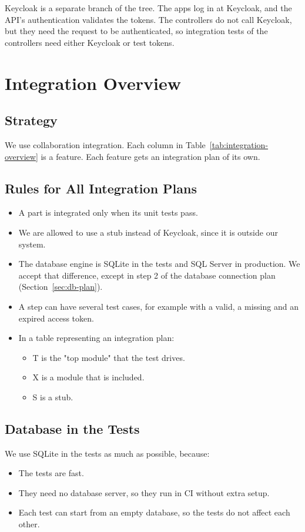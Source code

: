 \documentclass[a4paper,11pt]{article}
\begin{document}
Keycloak is a separate branch of the tree. The apps log in at Keycloak, and the API's authentication validates the tokens. The controllers do not call Keycloak, but they need the request to be authenticated, so integration tests of the controllers need either Keycloak or test tokens.

\section{Integration Overview}

\subsection{Strategy}
We use collaboration integration. Each column in Table~\ref{tab:integration-overview} is a feature. Each feature gets an integration plan of its own.

\subsection{Rules for All Integration Plans}
\begin{itemize}
  \item A part is integrated only when its unit tests pass.
  \item We are allowed to use a stub instead of Keycloak, since it is outside our system.
  \item The database engine is SQLite in the tests and SQL Server in production. We accept that difference, except in step 2 of the database connection plan (Section~\ref{sec:db-plan}).
  \item A step can have several test cases, for example with a valid, a missing and an expired access token.
  \item In a table representing an integration plan:
    \begin{itemize}
      \item T is the "top module" that the test drives.
      \item X is a module that is included.
      \item S is a stub.
    \end{itemize}
\end{itemize}

\subsection{Database in the Tests}
We use SQLite in the tests as much as possible, because:
\begin{itemize}
  \item The tests are fast.
  \item They need no database server, so they run in CI without extra setup.
  \item Each test can start from an empty database, so the tests do not affect each other.
\end{itemize}
\end{document}
